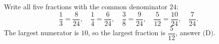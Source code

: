 Write all five fractions with the common denominator $24$:
\[
\dfrac{1}{3}=\dfrac{8}{24},\quad \dfrac{1}{4}=\dfrac{6}{24},\quad \dfrac{3}{8}=\dfrac{9}{24},\quad \dfrac{5}{12}=\dfrac{10}{24},\quad \dfrac{7}{24}.
\]
The largest numerator is $10$, so the largest fraction is $\dfrac{5}{12}$, answer $\boxed{\text{(D)}}$.

